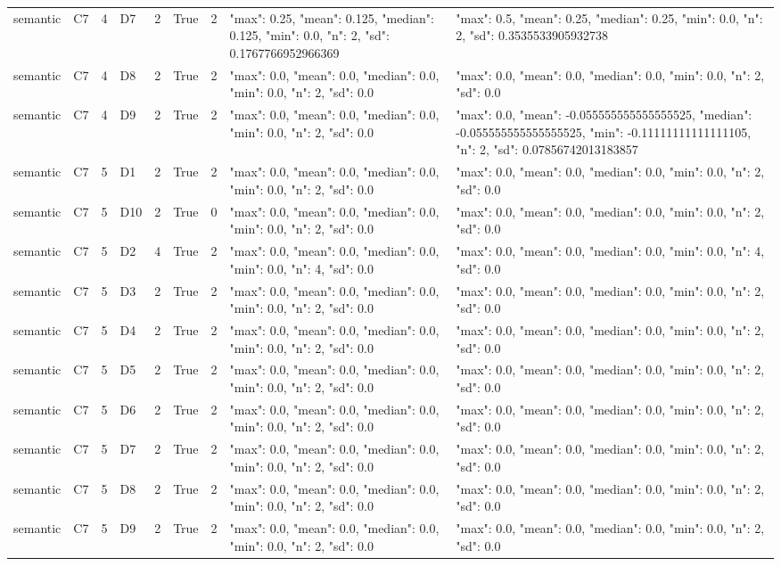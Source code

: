 \begin{tabular}{lllllllll}
semantic & C7 & 4 & D7 & 2 & True & 2 & {"max": 0.25, "mean": 0.125, "median": 0.125, "min": 0.0, "n": 2, "sd": 0.1767766952966369} & {"max": 0.5, "mean": 0.25, "median": 0.25, "min": 0.0, "n": 2, "sd": 0.3535533905932738} \\
semantic & C7 & 4 & D8 & 2 & True & 2 & {"max": 0.0, "mean": 0.0, "median": 0.0, "min": 0.0, "n": 2, "sd": 0.0} & {"max": 0.0, "mean": 0.0, "median": 0.0, "min": 0.0, "n": 2, "sd": 0.0} \\
semantic & C7 & 4 & D9 & 2 & True & 2 & {"max": 0.0, "mean": 0.0, "median": 0.0, "min": 0.0, "n": 2, "sd": 0.0} & {"max": 0.0, "mean": -0.055555555555555525, "median": -0.055555555555555525, "min": -0.11111111111111105, "n": 2, "sd": 0.07856742013183857} \\
semantic & C7 & 5 & D1 & 2 & True & 2 & {"max": 0.0, "mean": 0.0, "median": 0.0, "min": 0.0, "n": 2, "sd": 0.0} & {"max": 0.0, "mean": 0.0, "median": 0.0, "min": 0.0, "n": 2, "sd": 0.0} \\
semantic & C7 & 5 & D10 & 2 & True & 0 & {"max": 0.0, "mean": 0.0, "median": 0.0, "min": 0.0, "n": 2, "sd": 0.0} & {"max": 0.0, "mean": 0.0, "median": 0.0, "min": 0.0, "n": 2, "sd": 0.0} \\
semantic & C7 & 5 & D2 & 4 & True & 2 & {"max": 0.0, "mean": 0.0, "median": 0.0, "min": 0.0, "n": 4, "sd": 0.0} & {"max": 0.0, "mean": 0.0, "median": 0.0, "min": 0.0, "n": 4, "sd": 0.0} \\
semantic & C7 & 5 & D3 & 2 & True & 2 & {"max": 0.0, "mean": 0.0, "median": 0.0, "min": 0.0, "n": 2, "sd": 0.0} & {"max": 0.0, "mean": 0.0, "median": 0.0, "min": 0.0, "n": 2, "sd": 0.0} \\
semantic & C7 & 5 & D4 & 2 & True & 2 & {"max": 0.0, "mean": 0.0, "median": 0.0, "min": 0.0, "n": 2, "sd": 0.0} & {"max": 0.0, "mean": 0.0, "median": 0.0, "min": 0.0, "n": 2, "sd": 0.0} \\
semantic & C7 & 5 & D5 & 2 & True & 2 & {"max": 0.0, "mean": 0.0, "median": 0.0, "min": 0.0, "n": 2, "sd": 0.0} & {"max": 0.0, "mean": 0.0, "median": 0.0, "min": 0.0, "n": 2, "sd": 0.0} \\
semantic & C7 & 5 & D6 & 2 & True & 2 & {"max": 0.0, "mean": 0.0, "median": 0.0, "min": 0.0, "n": 2, "sd": 0.0} & {"max": 0.0, "mean": 0.0, "median": 0.0, "min": 0.0, "n": 2, "sd": 0.0} \\
semantic & C7 & 5 & D7 & 2 & True & 2 & {"max": 0.0, "mean": 0.0, "median": 0.0, "min": 0.0, "n": 2, "sd": 0.0} & {"max": 0.0, "mean": 0.0, "median": 0.0, "min": 0.0, "n": 2, "sd": 0.0} \\
semantic & C7 & 5 & D8 & 2 & True & 2 & {"max": 0.0, "mean": 0.0, "median": 0.0, "min": 0.0, "n": 2, "sd": 0.0} & {"max": 0.0, "mean": 0.0, "median": 0.0, "min": 0.0, "n": 2, "sd": 0.0} \\
semantic & C7 & 5 & D9 & 2 & True & 2 & {"max": 0.0, "mean": 0.0, "median": 0.0, "min": 0.0, "n": 2, "sd": 0.0} & {"max": 0.0, "mean": 0.0, "median": 0.0, "min": 0.0, "n": 2, "sd": 0.0} \\
\end{tabular}